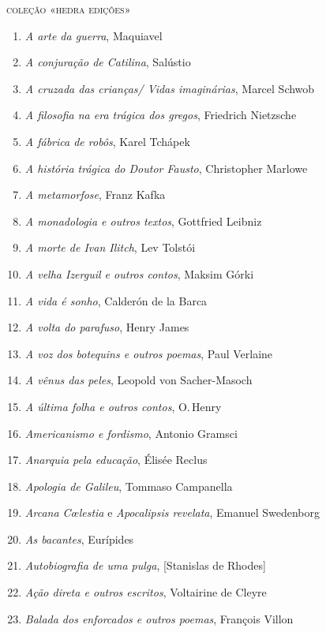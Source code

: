 \pagebreak
\blankpage
\pagestyle{empty}
\begingroup
\fontsize{7}{8}\selectfont

{\large\textsc{coleção «hedra edições»}}

\begin{enumerate}
\setlength\parskip{5pt}
\setlength\itemsep{-1.4mm}
\item \textit{A arte da guerra}, Maquiavel
\item \textit{A conjuração de Catilina}, Salústio
\item \textit{A cruzada das crianças/ Vidas imaginárias}, Marcel Schwob
\item \textit{A filosofia na era trágica dos gregos}, Friedrich Nietzsche
\item \textit{A fábrica de robôs}, Karel Tchápek 
\item \textit{A história trágica do Doutor Fausto}, Christopher Marlowe
\item \textit{A metamorfose}, Franz Kafka
\item \textit{A monadologia e outros textos}, Gottfried Leibniz
\item \textit{A morte de Ivan Ilitch}, Lev Tolstói 
\item \textit{A velha Izerguil e outros contos}, Maksim Górki
\item \textit{A vida é sonho}, Calderón de la Barca
\item \textit{A volta do parafuso}, Henry James
\item \textit{A voz dos botequins e outros poemas}, Paul Verlaine 
\item \textit{A vênus das peles}, Leopold von Sacher{}-Masoch
\item \textit{A última folha e outros contos}, O.\,Henry
\item \textit{Americanismo e fordismo}, Antonio Gramsci
\item \textit{Anarquia pela educação}, Élisée Reclus 
\item \textit{Apologia de Galileu}, Tommaso Campanella 
\item \textit{Arcana C\oe lestia} e \textit{Apocalipsis revelata}, Emanuel Swedenborg
\item \textit{As bacantes}, Eurípides
\item \textit{Autobiografia de uma pulga}, [Stanislas de Rhodes]
\item \textit{Ação direta e outros escritos}, Voltairine de Cleyre
\item \textit{Balada dos enforcados e outros poemas}, François Villon

\end{enumerate}
